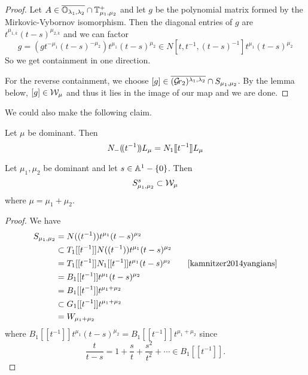 \documentclass{article}
\begin{document}
\begin{proof}
    Let $ A \in \overline{\OO_{\lambda_1,\lambda_2}}\cap\TT_{\mu_1,\mu_2}^+$ and let $ g $ be the polynomial matrix formed by the Mirkovic-Vybornov isomorphism.  Then the diagonal entries of $ g $ are $ t^{\mu_{1,k}} (t-s)^{\mu_{2,k}}$ and we can factor
    $$ g = (g t^{-\mu_1}(t-s)^{-\mu_2}) t^{\mu_1}(t-s)^{\mu_2} \in N[t, t^{-1}, (t-s)^{-1}] t^{\mu_1} (t-s)^{\mu_2}$$
    So we get containment in one direction.
    
    For the reverse containment, we choose $ [g] \in \overline{(\Grbd[2])^{\lambda_1,\lambda_2}}\cap S_{\mu_1,\mu_2}$.  By the lemma below, $[g] \in \cW_\mu$ and thus it lies in the image of our map and we are done.
\end{proof}



We could also make the following claim. 


\begin{lemma}[KWWY14]
    Let $\mu$ be dominant. Then 
    \begin{equation}
        N_{-}\xT[t^{-1}] L_\mu = N_1\xt[t^{-1}]L_\mu
    \end{equation}
\end{lemma}

\begin{lemma}%
    Let $\mu_1,\mu_2$ be dominant and let $s\in \AA^1 - \{0\}$. Then 
    \begin{equation}
        S_{\mu_1,\mu_2}^s \subset \cW_\mu 
    \end{equation}
    where $\mu = \mu_1 + \mu_2$.
\end{lemma}

\begin{proof}
    We have
\[
\begin{split}
    S_{\mu_1, \mu_2} & = N((t^{-1}))t^{\mu_1}(t-s)^{\mu_2} \\
     & \subset T_1[[t^{-1}]] N((t^{-1})) t^{\mu_1} (t-s)^{\mu_2} \\
     & = T_1[[t^{-1}]] N_1[[t^{-1}]] t^{\mu_1} (t-s)^{\mu_2} \qquad \text{\cite[Lemma 2.3]{kamnitzer2014yangians}}\\
     & = B_1[[t^{-1}]] t^{\mu_1} (t-s)^{\mu_2} \\
     & = B_1[[t^{-1}]] t^{\mu_1 + \mu_2} \\
     & \subset G_1[[t^{-1}]] t^{\mu_1 + \mu_2} \\
     & = W_{\mu_1 + \mu_2}
\end{split}
\]
where $B_1[[t^{-1}]] t^{\mu_1} (t-s)^{\mu_2} = B_1[[t^{-1}]] t^{\mu_1 + \mu_2}$ since 
\[
\frac{t}{t-s} = 
1 + \frac{s}{t} + \frac{s^2}{t^2} + \cdots 
\in B_1[[t^{-1}]].
\]
\end{proof}
\end{document}

